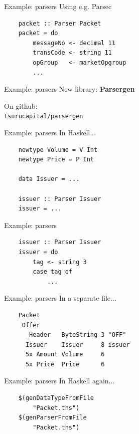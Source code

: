 \documentclass[20pt]{beamer}
\newcommand{\vspaced}{
    \vspace{5mm}
}
\begin{document}
\begin{frame}[fragile]{Example: parsers}
    Using e.g. Parsec \\
    \vspaced
    \begin{lstlisting}
    packet :: Parser Packet
    packet = do
        messageNo <- decimal 11
        transCode <- string 11
        opGroup   <- marketOpgroup
        ...
    \end{lstlisting}
\end{frame}

\begin{frame}{Example: parsers}
    New library: \textbf{Parsergen} \\
    \vspaced
    On github: \\
    \texttt{tsurucapital/parsergen}
\end{frame}

\begin{frame}[fragile]{Example: parsers}
    In Haskell... \\
    \vspaced
    \begin{lstlisting}
    newtype Volume = V Int
    newtype Price = P Int

    data Issuer = ...

    issuer :: Parser Issuer
    issuer = ...
    \end{lstlisting}
\end{frame}

\begin{frame}[fragile]{Example: parsers}
    \begin{lstlisting}
    issuer :: Parser Issuer
    issuer = do
        tag <- string 3
        case tag of
            ...
    \end{lstlisting}
\end{frame}

\begin{frame}[fragile]{Example: parsers}
    In a separate file...
    \vspaced
    \begin{lstlisting}
    Packet
     Offer
      _Header   ByteString 3 "OFF"
      Issuer    Issuer     8 issuer
      5x Amount Volume     6
      5x Price  Price      6
    \end{lstlisting}
\end{frame}

\begin{frame}[fragile]{Example: parsers}
    In Haskell again... \\
    \vspaced
    \begin{lstlisting}
    $(genDataTypeFromFile
        "Packet.ths")
    $(genParserFromFile
        "Packet.ths")
    \end{lstlisting}
\end{frame}
\end{document}
